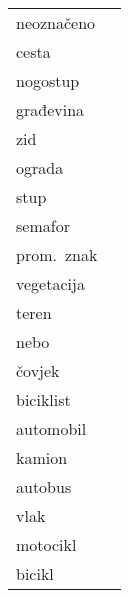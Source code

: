 \documentclass{beamer}
\begin{document}
\begin{frame}{}
{{{\begin{minipage}[b][6.3579cm]{2.0cm}
{\begin{minipage}[b]{1.5cm}
\begin{tabu} {@{}X[1,r,m]@{} @{}X[-1,c,m]@{}}
					neoznačeno &\vspace{0.5cm} \\
					cesta &\vspace{0.5cm} \\
					nogostup &\vspace{0.5cm} \\
					građevina &\vspace{0.5cm} \\
					zid &\vspace{0.5cm} \\
					ograda &\vspace{0.5cm} \\
					stup &\vspace{0.5cm} \\
					semafor &\vspace{0.5cm} \\
					prom.~znak &\vspace{0.5cm} \\
					vegetacija &\vspace{0.5cm} \\			
					teren &\vspace{0.5cm} \\			
					nebo &\vspace{0.5cm} \\			
					čovjek &\vspace{0.5cm} \\			
					biciklist &\vspace{0.5cm} \\
					automobil &\vspace{0.5cm} \\
					kamion &\vspace{0.5cm} \\			
					autobus &\vspace{0.5cm} \\			
					vlak &\vspace{0.5cm} \\	
					motocikl &\vspace{0.5cm} \\	
					bicikl &\vspace{0.5cm} \\
				\end{tabu}
			\end{minipage}
			}
		\end{minipage}
		}
		}}
\end{frame}
\end{document}
